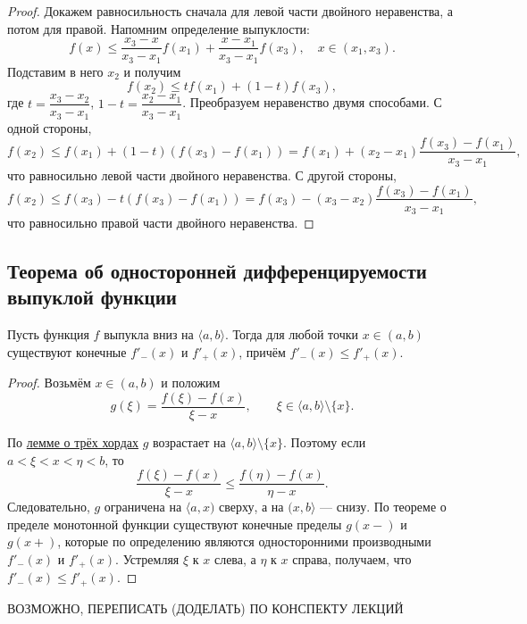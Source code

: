 \begin{proof}
	Докажем равносильность сначала для левой части двойного неравенства, а потом для правой.
	Напомним определение выпуклости: \[
		f(x) \leqslant \frac{x_3 - x}{x_3 - x_1} f(x_1) + \frac{x - x_1}{x_3 - x_1} f(x_3), \quad x \in (x_1, x_3).
	\]
	Подставим в него \(x_2\) и получим \[
		f(x_2) \leqslant t f(x_1) + (1 - t) f(x_3),
	\]
	где \(t = \dfrac{x_3 - x_2}{x_3 - x_1}\), \(1 - t = \dfrac{x_2 - x_1}{x_3 - x_1}\).
	Преобразуем неравенство двумя способами. С одной стороны, \[
		f(x_2) \leqslant f(x_1) + (1 - t)(f(x_3) - f(x_1)) = f(x_1) + (x_2 - x_1) \frac{f(x_3) - f(x_1)}{x_3 - x_1},
	\]
	что равносильно левой части двойного неравенства. С другой стороны, \[
		f(x_2) \leqslant f(x_3) - t (f(x_3) - f(x_1)) = f(x_3) - (x_3 - x_2) \frac{f(x_3) - f(x_1)}{x_3 - x_1},
	\] что равносильно правой части двойного неравенства.
\end{proof}

\subsection{Теорема об односторонней дифференцируемости выпуклой функции}

\begin{theorem}
	Пусть функция \(f\) выпукла вниз на \(\langle a, b \rangle\). Тогда для любой точки \(x \in (a, b)\) существуют конечные \(f'_-(x)\) и \(f'_+(x)\), причём \linebreak \(f'_-(x) \leqslant f'_+(x)\).
\end{theorem}

\begin{proof}
	Возьмём \(x \in (a, b)\) и положим \[
		g(\xi) = \frac{f(\xi) - f(x)}{\xi - x}, \qquad \xi \in \langle a, b \rangle \setminus \{x\}.
	\]
	
	По \hyperlink{trihordy}{лемме о трёх хордах} \(g\) возрастает на \(\langle a, b \rangle \setminus \{x\}\). Поэтому если \hbox{\(a < \xi < x < \eta < b\)}, то \[
		\frac{f(\xi) - f(x)}{\xi - x} \leqslant \frac{f(\eta) - f(x)}{\eta - x}.
	\]
	Следовательно, \(g\) ограничена на \(\langle a, x)\) сверху, а на \((x, b \rangle\) --- снизу. По теореме о пределе монотонной функции существуют конечные пределы \(g(x-)\) и \(g(x+)\), которые по определению являются односторонними производными \(f'_-(x)\) и \(f'_+(x)\). Устремляя \(\xi\) к \(x\) слева, а \(\eta\) к \(x\) справа, получаем, что \(f'_-(x) \leqslant f'_+(x)\). 
\end{proof}

ВОЗМОЖНО, ПЕРЕПИСАТЬ (ДОДЕЛАТЬ) ПО КОНСПЕКТУ ЛЕКЦИЙ

